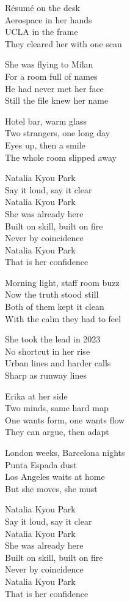 \begin{lyrics}
Résumé on the desk\\
Aerospace in her hands\\
UCLA in the frame\\
They cleared her with one scan

She was flying to Milan\\
For a room full of names\\
He had never met her face\\
Still the file knew her name

Hotel bar, warm glass\\
Two strangers, one long day\\
Eyes up, then a smile\\
The whole room slipped away

Natalia Kyou Park\\
Say it loud, say it clear\\
Natalia Kyou Park\\
She was already here\\
Built on skill, built on fire\\
Never by coincidence\\
Natalia Kyou Park\\
That is her confidence

Morning light, staff room buzz\\
Now the truth stood still\\
Both of them kept it clean\\
With the calm they had to feel

She took the lead in 2023\\
No shortcut in her rise\\
Urban lines and harder calls\\
Sharp as runway lines

Erika at her side\\
Two minds, same hard map\\
One wants form, one wants flow\\
They can argue, then adapt

London weeks, Barcelona nights\\
Punta Espada dust\\
Los Angeles waits at home\\
But she moves, she must

Natalia Kyou Park\\
Say it loud, say it clear\\
Natalia Kyou Park\\
She was already here\\
Built on skill, built on fire\\
Never by coincidence\\
Natalia Kyou Park\\
That is her confidence


\end{lyrics}
